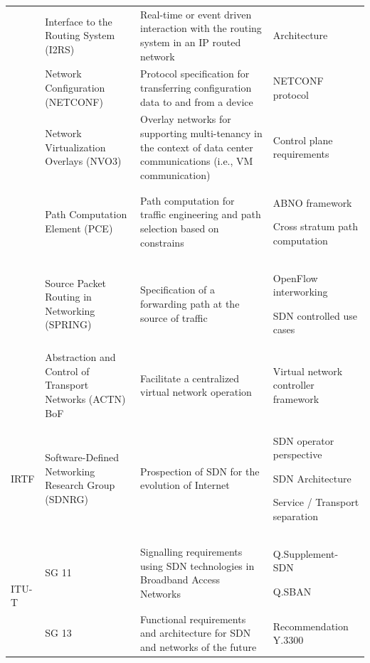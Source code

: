 {{\begin{table}[!htp]
\begin{center}
\begin{tabularx}{\linewidth}{p{0.8cm}p{3.8cm}Xp{4.6cm}}
& Interface to the Routing System (I2RS) & Real-time or event driven interaction with the routing system in an IP routed network	& Architecture~\cite{AIRS} \\\cline{2-4}

& Network Configuration (NETCONF) & Protocol specification for transferring configuration data to and from a device & NETCONF protocol~\cite{enns2004} \\\cline{2-4}

& Network Virtualization Overlays (NVO3) & Overlay networks for supporting multi-tenancy in the context of data center communications (i.e., VM communication) & Control plane requirements~\cite{NVENVA} \\\cline{2-4}

& Path Computation Element (PCE) & Path computation for traffic engineering and path selection based on constrains & ABNO framework~\cite{PCE} \par Cross stratum path computation~\cite{CSOPC} \\\cline{2-4}

& Source Packet Routing in Networking (SPRING) & Specification of a forwarding path at the source of traffic	 & OpenFlow interworking~\cite{khasnabish2014} \par SDN controlled use cases~\cite{kim2014} \\\cline{2-4}

& Abstraction and Control of Transport Networks (ACTN) BoF & Facilitate a centralized virtual network operation	 &   Virtual network controller framework~\cite{ceccarelli2014} \\
\hline
IRTF & Software-Defined Networking Research Group (SDNRG) & Prospection of SDN for the evolution of Internet & SDN operator perspective~\cite{boucadair2014} \par SDN Architecture~\cite{haleplidis2014} \par
 Service / Transport separation~\cite{contreras2014} \\
 \hline
\multirow{7}{*}{ITU-T} 
& SG 11 & Signalling requirements using SDN technologies in Broadband Access Networks & Q.Supplement-SDN~\cite{itutqsup2014} \par Q.SBAN~\cite{itutqsban2014} \\\cline{2-4}

& SG 13 & Functional requirements and architecture for SDN and networks of the future & Recommendation Y.3300~\cite{ituty33002014} \\\cline{2-4}


\end{tabularx}
\end{center}
\end{table}}}

